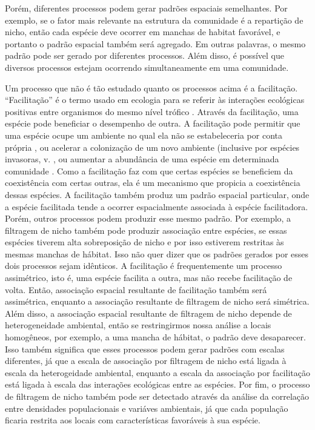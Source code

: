 \documentclass[twoside,12pt,a4paper]{report}
\begin{document}
Porém, diferentes processos podem gerar padrões espaciais semelhantes. Por exemplo, se o
fator mais relevante na estrutura da comunidade é a repartição de nicho, então cada espécie
deve ocorrer em manchas de habitat favorável, e portanto o padrão espacial também será
agregado. Em outras palavras, o mesmo padrão pode ser gerado por diferentes processos. Além
disso, é possível que diversos processos estejam ocorrendo simultaneamente em uma comunidade.

Um processo que não é tão estudado quanto os processos acima é a facilitação.
“Facilitação” é o termo usado em ecologia para se referir às interações ecológicas positivas entre
organismos do mesmo nível trófico \citep{Pakeman2009}. 
Através da facilitação, uma espécie pode beneficiar o desempenho de outra. 
A facilitação pode permitir que uma
espécie ocupe um ambiente no qual ela não se estabeleceria por conta própria \citep{Lortie2004},
ou acelerar a colonização de um novo ambiente (inclusive por espécies invasoras, v.
\citep{Wundrow2012}, ou aumentar a abundância de uma espécie em determinada comunidade \citep{Alados2006}.
Como a facilitação faz com que certas espécies se beneficiem da coexistência com certas
outras, ela é um mecanismo que propicia a coexistência dessas espécies.
A facilitação também produz um padrão espacial particular, onde a espécie facilitada tende a
ocorrer espacialmente associada à espécie facilitadora.
Porém, outros processos podem produzir esse mesmo padrão. Por exemplo, a filtragem de nicho
também pode produzir associação entre espécies, se essas espécies tiverem alta sobreposição
de nicho e por isso estiverem restritas às mesmas manchas de hábitat. Isso não quer dizer que
os padrões gerados por esses dois processos sejam idênticos. A facilitação é frequentemente
um processo assimétrico, isto é, uma espécie facilita a outra, mas não recebe facilitação de
volta. Então, associação espacial resultante de facilitação também será assimétrica, enquanto
a associação resultante de filtragem de nicho será simétrica. Além disso, a associação
espacial resultante de filtragem de nicho depende de heterogeneidade ambiental, então se
restringirmos nossa análise a locais homogêneos, por exemplo, a uma mancha de hábitat, o
padrão deve desaparecer. Isso também significa que esses processos podem gerar padrões com
escalas diferentes, já que a escala de associação por filtragem de nicho está ligada à escala
da heterogeidade ambiental, enquanto a escala da associação por facilitação está ligada à
escala das interações ecológicas entre as espécies. Por fim, o processo de filtragem de nicho
também pode ser detectado através da análise da correlação entre densidades populacionais e
variáves ambientais, já que cada população ficaria restrita aos locais com características
favoráveis à sua espécie.
\end{document}
